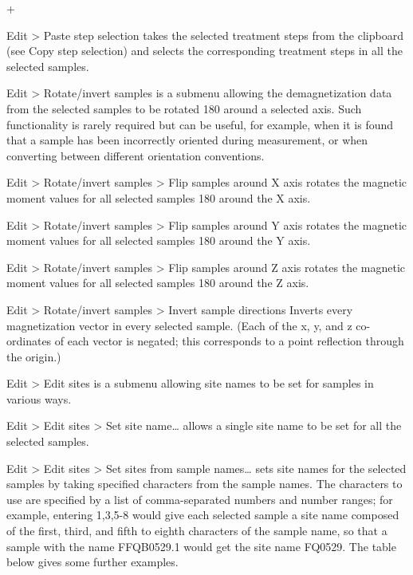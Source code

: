 \documentclass[a4paper,british]{article}
\newcommand{\menuitemlabel}[1]{%
\mbox{\textsf{#1}}\hfil}
\newenvironment{menuitemlist}%
{\begin{list}{}{%
\renewcommand{\makelabel}{\menuitemlabel}%
\setlength{\labelwidth}{35pt}%
\setlength{\leftmargin}%
             {\labelwidth+\labelsep}}}%
{\end{list}}
\newcommand{\ppcmd}[1]{\textsf{#1}} %
\newcommand{\submenu}{ \textgreater{} } %
\begin{document}
\begin{menuitemlist}
\item[Edit\submenu Paste step selection] takes the selected treatment steps
  from the clipboard (see \ppcmd{Copy step selection}) and selects the
  corresponding treatment steps in all the selected samples.

\item[Edit\submenu Rotate/invert samples] is a submenu allowing the
  demagnetization data from the selected samples to be rotated 180\textdegree{}
  around a selected axis. Such functionality is rarely required but can be
  useful, for example, when it is found that a sample has been incorrectly
  oriented during measurement, or when converting between different
  orientation conventions.

\item[Edit\submenu Rotate/invert samples\submenu Flip samples around X axis]
  rotates the magnetic moment values for all selected samples
  180\textdegree{} around the X axis.

\item[Edit\submenu Rotate/invert samples\submenu Flip samples around Y axis]
  rotates the magnetic moment values for all selected samples
  180\textdegree{} around the Y axis.

\item[Edit\submenu Rotate/invert samples\submenu Flip samples around Z axis]
  rotates the magnetic moment values for all selected samples
  180\textdegree{} around the Z axis.

\item[Edit\submenu Rotate/invert samples\submenu Invert sample directions]
  Inverts every magnetization vector in every selected sample.
  (Each of the x, y, and z co-ordinates of each vector is negated;
  this corresponds to a point reflection through the origin.)

\item[Edit\submenu Edit sites] is a submenu allowing site names to be
  set for samples in various ways.

\item[Edit\submenu Edit sites\submenu Set site name\ldots] allows a single
  site name to be set for all the selected samples.

\item[Edit\submenu Edit sites\submenu Set sites from sample names\ldots] sets
  site names for the selected samples by taking specified characters from the
  sample names. The characters to use are specified by a list of
  comma-separated numbers and number ranges; for example, entering
  \ppcmd{1,3,5-8} would give each selected sample a site name composed of the
  first, third, and fifth to eighth characters of the sample name, so that
  a sample with the name \ppcmd{FFQB0529.1} would get the site name
  \ppcmd{FQ0529}. The table below gives some further examples.


\end{menuitemlist}
\end{document}
